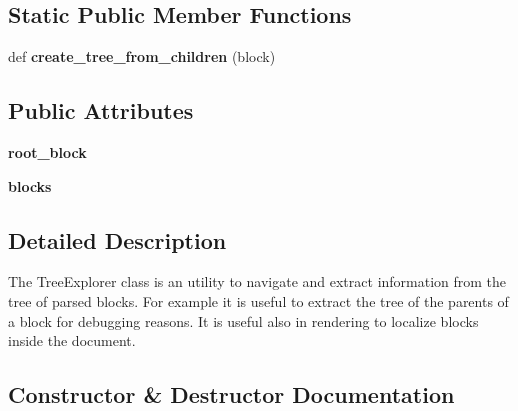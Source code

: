 \subsection*{Static Public Member Functions}
\begin{DoxyCompactItemize}
\item 
\hypertarget{classtexla_1_1Parser_1_1TreeExplorer_1_1TreeExplorer_a8502a4b4eea15fb192b65a4174627ba9}{}\label{classtexla_1_1Parser_1_1TreeExplorer_1_1TreeExplorer_a8502a4b4eea15fb192b65a4174627ba9} 
def {\bfseries create\+\_\+tree\+\_\+from\+\_\+children} (block)
\end{DoxyCompactItemize}
\subsection*{Public Attributes}
\begin{DoxyCompactItemize}
\item 
\hypertarget{classtexla_1_1Parser_1_1TreeExplorer_1_1TreeExplorer_a318bd6f70f7691ea7c0f49be6cb7ceb6}{}\label{classtexla_1_1Parser_1_1TreeExplorer_1_1TreeExplorer_a318bd6f70f7691ea7c0f49be6cb7ceb6} 
{\bfseries root\+\_\+block}
\item 
\hypertarget{classtexla_1_1Parser_1_1TreeExplorer_1_1TreeExplorer_a8ebbc7c21ef860caae95e9be5fb66821}{}\label{classtexla_1_1Parser_1_1TreeExplorer_1_1TreeExplorer_a8ebbc7c21ef860caae95e9be5fb66821} 
{\bfseries blocks}
\end{DoxyCompactItemize}


\subsection{Detailed Description}
\begin{DoxyVerb}The TreeExplorer class is an utility to navigate
and extract information from the tree of parsed blocks.
For example it is useful to extract the tree of the
parents of a block for debugging reasons. It is useful
also in rendering to localize blocks inside the document.
\end{DoxyVerb}
 

\subsection{Constructor \& Destructor Documentation}
\hypertarget{classtexla_1_1Parser_1_1TreeExplorer_1_1TreeExplorer_a02f877a37a394d2a471cab047dc04529}{}\label{classtexla_1_1Parser_1_1TreeExplorer_1_1TreeExplorer_a02f877a37a394d2a471cab047dc04529} 
